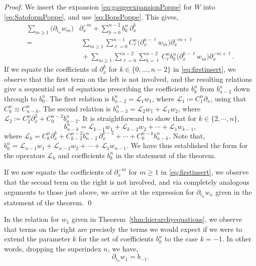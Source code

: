 \documentclass[5p,twocolumn]{elsarticle}
\newcommand*{\pa}{{\partial}}
\begin{document}
%
\begin{proof}
We insert the expansion \eqref{eq:gaugeexpansionPoppe} for $W$ into \eqref{eq:SatoformPoppe}, and use \eqref{eq:BopsPoppe}. 
This gives,
\begin{align}
  \sum_{m\geqslant1}\bigl(\pa_{t_n}w_m\bigr)&\pa_x^{-m}+\sum_{k=0}^{n-2}b_k^n\,\pa_x^k\nonumber\\
  =&\;\sum_{m\geqslant1}\sum_{\ell=0}^{n-1}C_\ell^n\bigl(\pa_x^{n-\ell}w_m\bigr)\pa_x^{-m+\ell}\nonumber\\
  &\;+\sum_{m\geqslant1}\sum_{\ell=0}^{n-2}\sum_{k=\ell}^{n-2}C_\ell^nb_k^n\bigl(\pa_x^{k-\ell}w_m\bigr)\pa_x^{-m+\ell}.\label{eq:firstinsert}
\end{align}
If we equate the coefficients of $\pa_x^k$ for $k\in\{0,\ldots,n-2\}$ in \eqref{eq:firstinsert}, we observe that the first term on the left is not involved,
and the resulting relations give a sequential set of equations prescribing the coefficients $b_k^n$ from $b_{n-2}^n$ down through to $b_0^n$.
The first relation is $b_{n-2}^n=\mathcal L_1w_1$, where $\mathcal L_1\coloneqq C_{1}^n\pa_x$, using that $C_k^n\equiv C_{n-k}^n$.
The second relation is $b_{n-3}^n=\mathcal L_2w_1+\mathcal L_1w_2$, where $\mathcal L_2\coloneqq C_{2}^n\pa_x^2+C_{0}^{n-2}b_{n-2}^n$.
It is straightforward to show that for $k\in\{2,\cdots,n\}$, 
\begin{equation*}
  b_{n-k}^n=\mathcal L_{k-1}w_1+\mathcal L_{k-2}w_2+\cdots+\mathcal L_1w_{k-1},
\end{equation*}
where $\mathcal L_{k}=C_{k}^n\pa_x^k+C_{k-2}^{n-2}b_{n-2}^n\,\pa_x^{k-2}+\cdots+C_{0}^{n-k}b_{n-k}^n$.
Note that, $b_0^n=\mathcal L_{n-1}w_1+\mathcal L_{n-2}w_2+\cdots+\mathcal L_{1}w_{n-1}$.
We have thus established the form for the operators $\mathcal L_k$ and coefficients $b_k^n$ in the statement of the theorem.

If we now equate the coefficients of $\pa_x^{-m}$ for $m\geqslant1$ in \eqref{eq:firstinsert}, we observe that the second term on the right is not involved,
and via completely analogous arguments to those just above, we arrive at the expression for $\pa_{t_n}w_\kappa$ given in the statement of the theorem. 
\qed
\end{proof}
%
\begin{remark}\label{rmk:b_1}
  In the relation for $w_1$ given in Theorem~\ref{thm:hierarchyequations}, we observe that terms on the right are precisely the terms
  we would expect if we were to extend the parameter $k$ for the set of coefficients $b_k^n$ to the case $k=-1$.
  In other words, dropping the superindex $n$, we have,
  \begin{equation*}
    \pa_{t_n}w_1=b_{-1}.
  \end{equation*}
\end{remark}
\end{document}

